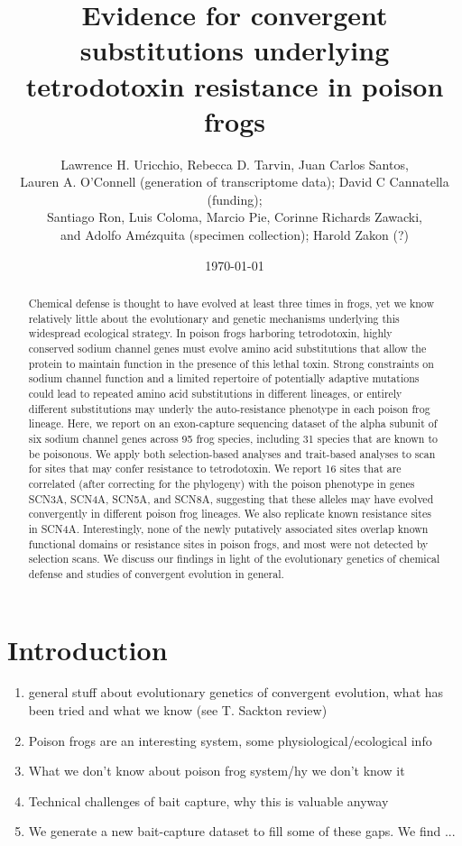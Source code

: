 \documentclass{article}
\title{Evidence for convergent substitutions underlying tetrodotoxin resistance in poison frogs}
\author{Lawrence H. Uricchio, Rebecca D. Tarvin, Juan Carlos Santos, \\ Lauren A. O'Connell (generation of transcriptome data); David C Cannatella (funding); \\ Santiago Ron, Luis Coloma, Marcio Pie, Corinne Richards Zawacki,\\  and Adolfo Amézquita (specimen collection); Harold Zakon (?)}
\date{\today}
\begin{document}
\linenumbers



\maketitle

\begin{abstract}
    Chemical defense is thought to have evolved at least three times in frogs, yet we know relatively little about the evolutionary and genetic mechanisms underlying this widespread ecological strategy. In poison frogs harboring tetrodotoxin, highly conserved sodium channel genes must evolve amino acid substitutions that allow the protein to maintain function in the presence of this lethal toxin. Strong constraints on sodium channel function and a limited repertoire of potentially adaptive mutations could lead to repeated amino acid substitutions in different lineages, or entirely different substitutions may underly the auto-resistance phenotype in each poison frog lineage. Here, we report on an exon-capture sequencing dataset of the alpha subunit of six sodium channel genes across 95 frog species, including 31 species that are known to be poisonous. We apply both selection-based analyses and trait-based analyses to scan for sites that may confer resistance to tetrodotoxin. We report 16 sites that are correlated (after correcting for the phylogeny) with the poison phenotype in genes SCN3A, SCN4A, SCN5A, and SCN8A, suggesting that these alleles may have evolved convergently in different poison frog lineages. We also replicate known resistance sites in SCN4A. Interestingly, none of the newly putatively associated sites overlap known functional domains or resistance sites in poison frogs, and most were not detected by selection scans. We discuss our findings in light of the evolutionary genetics of chemical defense and studies of convergent evolution in general.
    
\end{abstract}


\linespread{1.5}\selectfont
\section*{Introduction}


\begin{enumerate}
    \item general stuff about evolutionary genetics of convergent evolution, what has been tried and what we know (see T. Sackton review)
    \item Poison frogs are an interesting system, some physiological/ecological info 
    \item What we don't know about poison frog system/hy we don't know it
    \item Technical challenges of bait capture, why this is valuable anyway
    \item We generate a new bait-capture dataset to fill some of these gaps. We find ...
\end{enumerate}
\end{document}
